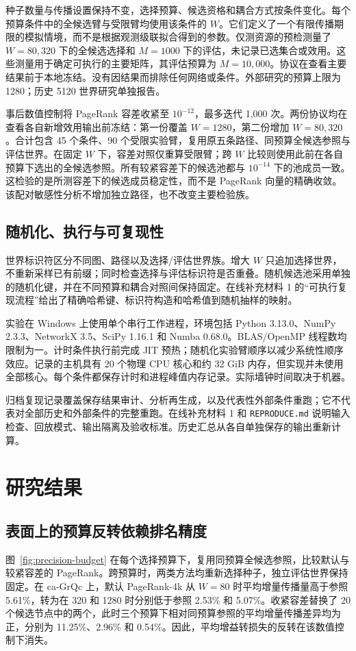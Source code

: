 \documentclass[smallextended]{svjour3}
\begin{document}
种子数量与传播设置保持不变，选择预算、候选资格和耦合方式按条件变化。每个预算条件中的全候选臂与受限臂均使用该条件的 $W$。它们定义了一个有限传播期限的模拟情境，而不是根据观测级联拟合得到的参数。仅测资源的预检测量了 $W=80,320$ 下的全候选选择和 $M=1000$ 下的评估，未记录已选集合或效用。这些测量用于确定可执行的主要矩阵，其评估预算为 $M=10,000$。协议在查看主要结果前于本地冻结。没有因结果而排除任何网络或条件。外部研究的预算上限为 1280；历史 5120 世界研究单独报告。

事后数值控制将 PageRank 容差收紧至 $10^{-12}$，最多迭代 1,000 次。两份协议均在查看各自新增效用输出前冻结：第一份覆盖 $W=1280$，第二份增加 $W=80,320$。合计包含 45 个条件、90 个受限实验臂，复用原五条路径、同预算全候选参照与评估世界。在固定 $W$ 下，容差对照仅重算受限臂；跨 $W$ 比较则使用此前在各自预算下选出的全候选参照。所有较紧容差下的候选池都与 $10^{-14}$ 下的池成员一致。这检验的是所测容差下的候选成员稳定性，而不是 PageRank 向量的精确收敛。该配对敏感性分析不增加独立路径，也不改变主要检验族。

\subsection{随机化、执行与可复现性}
世界标识符区分不同图、路径以及选择/评估世界族。增大 $W$ 只追加选择世界，不重新采样已有前缀；同时检查选择与评估标识符是否重叠。随机候选池采用单独的随机化键，并在不同预算和耦合对照间保持固定。在线补充材料 1 的“可执行复现流程”给出了精确哈希键、标识符构造和哈希值到随机抽样的映射。

实验在 Windows 上使用单个串行工作进程，环境包括 Python 3.13.0、NumPy 2.3.3、NetworkX 3.5、SciPy 1.16.1 和 Numba 0.68.0。BLAS/OpenMP 线程数均限制为一。计时条件执行前完成 JIT 预热；随机化实验臂顺序以减少系统性顺序效应。记录的主机具有 20 个物理 CPU 核心和约 32 GiB 内存，但实现并未使用全部核心。每个条件都保存计时和进程峰值内存记录。实际墙钟时间取决于机器。

归档复现记录覆盖保存结果审计、分析再生成，以及代表性外部条件重跑；它不代表对全部历史和外部条件的完整重跑。在线补充材料 1 和 \texttt{REPRODUCE.md} 说明输入检查、回放模式、输出隔离及验收标准。历史汇总从各自单独保存的输出重新计算。

\section{研究结果}
\subsection{表面上的预算反转依赖排名精度}
图~\ref{fig:precision-budget} 在每个选择预算下，复用同预算全候选参照，比较默认与较紧容差的 PageRank。跨预算时，两类方法均重新选择种子，独立评估世界保持固定。在 ca-GrQc 上，默认 PageRank-4k 从 $W=80$ 时平均增量传播量高于参照 5.61\%，转为在 320 和 1280 时分别低于参照 2.53\% 和 5.07\%。收紧容差替换了 20 个候选节点中的两个，此时三个预算下相对同预算参照的平均增量传播差异均为正，分别为 11.25\%、2.96\% 和 0.54\%。因此，平均增益转损失的反转在该数值控制下消失。
\end{document}
